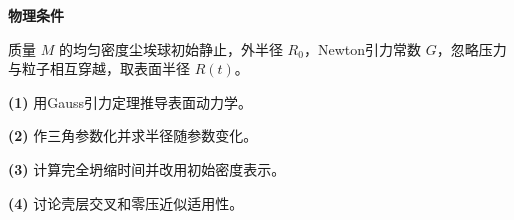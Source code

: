 \textbf{物理条件}\par 质量 \(M\) 的均匀密度尘埃球初始静止，外半径 \(R_0\)，Newton引力常数 \(G\)，忽略压力与粒子相互穿越，取表面半径 \(R(t)\)。
\par\noindent\textbf{(1)} 用Gauss引力定理推导表面动力学。
\par\noindent\textbf{(2)} 作三角参数化并求半径随参数变化。
\par\noindent\textbf{(3)} 计算完全坍缩时间并改用初始密度表示。
\par\noindent\textbf{(4)} 讨论壳层交叉和零压近似适用性。
